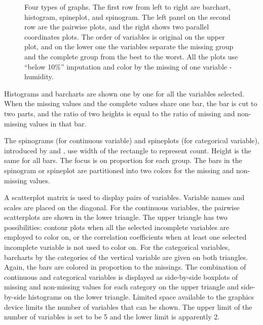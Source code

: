 \documentclass[article]{jss}
\begin{document}
\begin{center}
\begin{figure}[h]
\begin{centering}
\par\end{centering}
\caption{Four types of graphs.
The first row from left to right are barchart, histogram, spineplot, and spinogram. The left panel on the second row are the pairwise plots, and the right shows two parallel coordinates plots. The order of variables is original on the upper plot, and on the lower one the variables separate the missing group and the complete group from the best to the worst. All the plots use ``below 10\%'' imputation and color by the missing of one variable - humidity.}
\label{fig:graphtypes}
\end{figure}
\par\end{center}


Histograms and barcharts are shown one by one for all the variables selected. When the missing values and the complete values share one bar, the bar is cut to two parts, and the ratio of two heights is equal to the ratio of missing and non-missing values in that bar.

The spinograms (for continuous variable) and spineplots (for categorical variable), introduced by \citet{hummel1996linked} and \citet{theus1999visualizing}, use width of the rectangle to represent count. Height is the same for all bars. The focus is on proportion for each group. The bars in the spinogram or spineplot are partitioned into two colors for the missing and non-missing values.

A scatterplot matrix is used to display pairs of variables. Variable names and scales are placed on the diagonal. For the continuous variables, the pairwise scatterplots are shown in the lower triangle. The upper triangle has two possibilities: contour plots when all the selected incomplete variables are employed to color on, or the correlation coefficients when at least one selected incomplete variable is not used to color on. For the categorical variables, barcharts by the categories of the vertical variable are given on both triangles. Again, the bars are colored in proportion to the missings. The combination of continuous and categorical variables is displayed as side-by-side boxplots of missing and non-missing values for each category on the upper triangle and side-by-side histograms on the lower triangle. Limited space available to the graphics device limits the number of variables that can be shown. The upper limit of the number of variables is set to be 5 and the lower limit is apparently 2.
\end{document}
